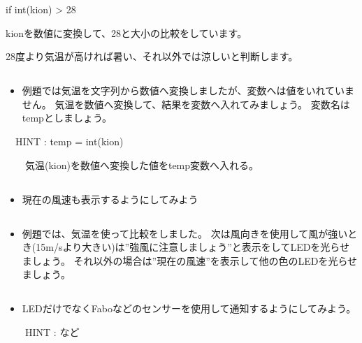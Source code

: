 if int(kion) {\textgreater} 28

kionを数値に変換して、28と大小の比較をしています。

28度より気温が高ければ暑い、それ以外では涼しいと判断します。


\bigskip



\subsection*{\theQuestion\label{Q:amedas4}}
\begin{itemize}
\item
例題では気温を文字列から数値へ変換しましたが、変数へは値をいれていません。
		気温を数値へ変換して、結果を変数へ入れてみましょう。
		変数名はtempとしましょう。
\end{itemize}
\ \ HINT : temp = int(kion)

\ \ \ \ 気温(kion)を数値へ変換した値をtemp変数へ入れる。

\subsection*{\theQuestion\label{Q:amedas5}}
\begin{itemize}
\item
現在の風速も表示するようにしてみよう
\end{itemize}
\clearpage{}
\subsection*{\theQuestion\label{Q:amedas6}}
\begin{itemize}
\item
例題では、気温を使って比較をしました。
		次は風向きを使用して風が強いとき(15m/sより大きい)は”強風に注意しましょう”と表示をしてLEDを光らせましょう。
		それ以外の場合は”現在の風速”を表示して他の色のLEDを光らせましょう。
\end{itemize}
\subsection*{\theQuestion\label{Q:amedas7}}
\begin{itemize}
\item
LEDだけでなくFaboなどのセンサーを使用して通知するようにしてみよう。
\end{itemize}
\ \ \ \ HINT : など


